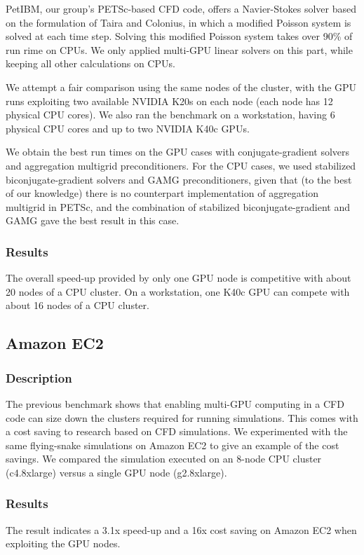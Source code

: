     PetIBM, our group's PETSc-based CFD code, offers a Navier-Stokes solver based on 
    the formulation of Taira and Colonius\cite{Taira-2007-ID69}, in which a modified 
    Poisson system is solved at each time step.
    Solving this modified Poisson system takes over 90\% of run rime on CPUs.
    We only applied multi-GPU linear solvers on this part, while keeping all other
    calculations on CPUs.

    We attempt a fair comparison using the same nodes of the cluster, with
    the GPU runs exploiting two available NVIDIA K20s on each node
    (each node has 12 physical CPU cores).
    We also ran the benchmark on a workstation, having 6 physical 
    CPU cores and up to two NVIDIA K40c GPUs.

    We obtain the best run times on the GPU cases with conjugate-gradient solvers and 
    aggregation multigrid preconditioners.
    For the CPU cases, we used stabilized biconjugate-gradient solvers and GAMG 
    preconditioners, given that (to the best of our knowledge) there is no 
    counterpart implementation of aggregation multigrid in PETSc,
    and the combination of stabilized biconjugate-gradient and GAMG gave 
    the best result in this case.

    \subsubsection{Results}
    The overall speed-up provided by only one GPU node is 
    competitive with about 20 nodes of a CPU cluster. 
    On a workstation, one K40c GPU can compete with about 16 nodes of a CPU cluster.

\subsection{Amazon EC2}

    \subsubsection{Description}
    The previous benchmark shows that enabling multi-GPU computing in a CFD code can
    size down the clusters required for running simulations.
    This comes with a cost saving to research based on CFD simulations.
    We experimented with the same flying-snake simulations on Amazon EC2 to give 
    an example of the cost savings.
    We compared the simulation executed on an 8-node CPU cluster (c4.8xlarge)
    versus a single GPU node (g2.8xlarge). 

    \subsubsection{Results}
    The result indicates a 3.1x speed-up and a 16x cost saving on Amazon EC2
    when exploiting the GPU nodes.


